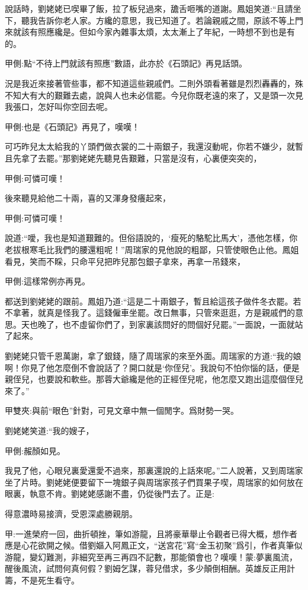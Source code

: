\begin{parag}
    說話時，劉姥姥已喫畢了飯，拉了板兒過來，舚舌咂嘴的道謝。鳳姐笑道:“且請坐下，聽我告訴你老人家。方纔的意思，我已知道了。若論親戚之間，原該不等上門來就該有照應纔是。但如今家內雜事太煩，太太漸上了年紀，一時想不到也是有的。\begin{note}甲側:點“不待上門就該有照應”數語，此亦於《石頭記》再見話頭。\end{note}況是我近來接著管些事，都不知道這些親戚們。二則外頭看著雖是烈烈轟轟的，殊不知大有大的艱難去處，說與人也未必信罷。今兒你既老遠的來了，又是頭一次見我張口，怎好叫你空回去呢。\begin{note}甲側:也是《石頭記》再見了，嘆嘆！\end{note}可巧昨兒太太給我的丫頭們做衣裳的二十兩銀子，我還沒動呢，你若不嫌少，就暫且先拿了去罷。”那劉姥姥先聽見告艱難，只當是沒有，心裏便突突的，\begin{note}甲側:可憐可嘆！\end{note}後來聽見給他二十兩，喜的又渾身發癢起來，\begin{note}甲側:可憐可嘆！\end{note}說道:“噯，我也是知道艱難的。但俗語說的，‘瘦死的駱駝比馬大’，憑他怎樣，你老拔根寒毛比我們的腰還粗呢！”周瑞家的見他說的粗鄙，只管使眼色止他。鳳姐看見，笑而不睬，只命平兒把昨兒那包銀子拿來，再拿一吊錢來，\begin{note}甲側:這樣常例亦再見。\end{note}都送到劉姥姥的跟前。鳳姐乃道:“這是二十兩銀子，暫且給這孩子做件冬衣罷。若不拿著，就真是怪我了。這錢僱車坐罷。改日無事，只管來逛逛，方是親戚們的意思。天也晚了，也不虛留你們了，到家裏該問好的問個好兒罷。”一面說，一面就站了起來。
\end{parag}


\begin{parag}
    劉姥姥只管千恩萬謝，拿了銀錢，隨了周瑞家的來至外面。周瑞家的方道:“我的娘啊！你見了他怎麼倒不會說話了？開口就是‘你侄兒’。我說句不怕你惱的話，便是親侄兒，也要說和軟些。那蓉大爺纔是他的正經侄兒呢，他怎麼又跑出這麼個侄兒來了。”\begin{note}甲雙夾:與前“眼色”針對，可見文章中無一個閒字。爲財勢一哭。\end{note}劉姥姥笑道:“我的嫂子，\begin{note}甲側:赧顏如見。\end{note}我見了他，心眼兒裏愛還愛不過來，那裏還說的上話來呢。”二人說著，又到周瑞家坐了片時。劉姥姥便要留下一塊銀子與周瑞家孩子們買果子喫，周瑞家的如何放在眼裏，執意不肯。劉姥姥感謝不盡，仍從後門去了。正是:
\end{parag}


\begin{poem}
    \begin{pl}得意濃時易接濟，受恩深處勝親朋。\end{pl}
\end{poem}


\begin{parag}
    \begin{note}甲:一進榮府一回，曲折頓挫，筆如游龍，且將豪華舉止令觀者已得大概，想作者應是心花欲開之候。借劉嫗入阿鳳正文，“送宮花”寫“金玉初聚”爲引，作者真筆似游龍，變幻難測，非細究至再三再四不記數，那能領會也？嘆嘆！蒙:夢裏風流，醒後風流，試問何真何假？劉姆乞謀，蓉兒借求，多少顛倒相酬。英雄反正用計籌，不是死生看守。\end{note}
\end{parag}
